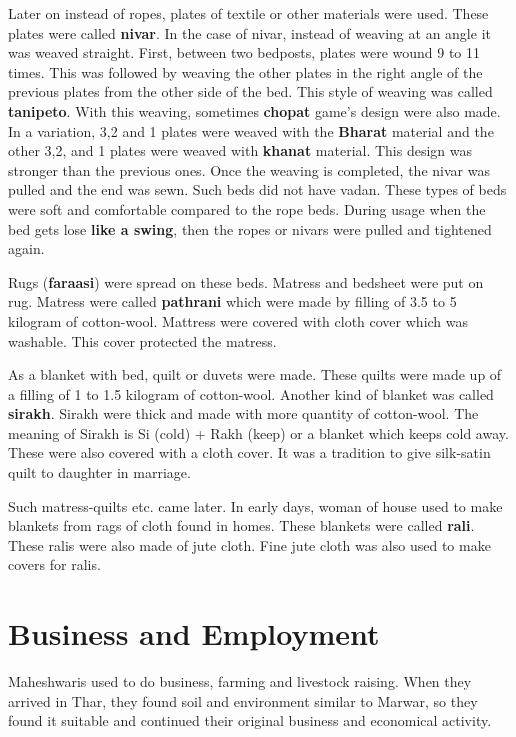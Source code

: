 Later on instead of ropes, plates of textile or other materials were used. These
plates were called \textbf{nivar}. In the case of nivar, instead of weaving at
an angle it was weaved straight. First, between two bedposts, plates
were wound 9 to 11 times. This was followed by weaving the other plates in the
right angle of the previous plates from the other side of the bed. This style of
weaving was called \textbf{tanipeto}. With this weaving, sometimes
\textbf{chopat} game's design were also made. In a variation, 3,2 and 1 plates
were weaved with the \textbf{Bharat} material and the other 3,2, and 1 plates
were weaved with \textbf{khanat} material. This design was stronger than the
previous ones. Once the weaving is completed, the nivar was pulled and the end
was sewn. Such beds did not have vadan. These types of beds were soft and
comfortable compared to the rope beds. During usage when the bed gets lose
\textbf{like a swing}, then the ropes or nivars were pulled and tightened again.

Rugs (\textbf{faraasi}) were spread on these beds. Matress and bedsheet were put
on rug. Matress were called \textbf{pathrani} which were made by filling of 3.5
to 5 kilogram of cotton-wool. Mattress were covered with cloth cover which was
washable. This cover protected the matress. 

As a blanket with bed, quilt or duvets were made. These quilts were made up of a
filling of 1 to 1.5 kilogram of cotton-wool. Another kind of blanket was called
\textbf{sirakh}. Sirakh were thick and made with more quantity of cotton-wool.
The meaning of Sirakh is Si (cold) + Rakh (keep) or a blanket which keeps cold
away. These were also covered with a cloth cover. It was a tradition to give
silk-satin quilt to daughter in marriage. 

Such matress-quilts etc. came later. In early days, woman of house used to make
blankets from rags of cloth found in homes. These blankets were called
\textbf{rali}. These ralis were also made of jute cloth. Fine jute cloth was
also used to make covers for ralis. 

\section{Business and Employment}
Maheshwaris used to do business, farming and livestock raising. When they
arrived in Thar, they found soil and environment similar to Marwar, so they
found it suitable and continued their original business and economical activity.

